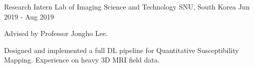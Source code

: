 \begin{cventries}
  \cventry
    {Research Intern} %
    {Lab of Imaging Science and Technology} %
    {SNU, South Korea} %
    {Jun 2019 - Aug 2019} %
    {
      \begin{cvitems} %
        \item {Advised by Professor Jongho Lee.}
        \item {Designed and implemented a full DL pipeline for Quantitative Susceptibility Mapping. Experience on heavy 3D MRI field data.}
      \end{cvitems}
    }

\end{cventries}
